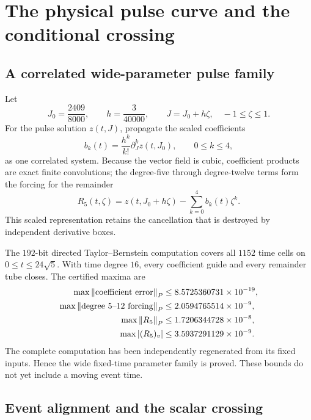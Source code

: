 \section{The physical pulse curve and the conditional crossing}\label{sec:pulse-crossing}
\subsection{A correlated wide-parameter pulse family}

Let
\[
 J_0=\frac{2409}{8000},\qquad
 h=\frac3{40000},\qquad J=J_0+h\zeta,\quad -1\le\zeta\le1.
\]
For the pulse solution \(z(t,J)\), propagate the scaled coefficients
\begin{equation}
 b_k(t)=\frac{h^k}{k!}\partial_J^kz(t,J_0),
 \qquad 0\le k\le4,                                    \label{eq:scaled-jet}
\end{equation}
as one correlated system.  Because the vector field is cubic, coefficient
products are exact finite convolutions; the degree-five through degree-twelve
terms form the forcing for the remainder
\begin{equation}
 R_5(t,\zeta)=z(t,J_0+h\zeta)-\sum_{k=0}^4b_k(t)\zeta^k.
                                                               \label{eq:R5}
\end{equation}
This scaled representation retains the cancellation that is destroyed by
independent derivative boxes.

The \(192\)-bit directed Taylor--Bernstein computation covers all \(1152\)
time cells on \(0\le t\le24\sqrt5\).  With time degree \(16\), every
coefficient guide and every remainder tube closes.  The certified maxima
are
\begin{align}
 \max\left\lVert\text{coefficient error}\right\rVert_P
   &\le8.5725360731\times10^{-19},\\
 \max\left\lVert\text{degree }5\text{--}12\text{ forcing}\right\rVert_P
   &\le2.0594765514\times10^{-9},\\
 \max\left\lVert R_5\right\rVert_P
   &\le1.7206344728\times10^{-8},                       \label{eq:wide-jet-bounds}\\
 \max\left\lvert(R_5)_v\right\rvert
   &\le3.5937291129\times10^{-9}.
\end{align}
The complete computation has been independently regenerated from its fixed
inputs.  Hence the wide fixed-time parameter family is proved.  These bounds
do not yet include a moving event time.

\subsection{Event alignment and the scalar crossing}

